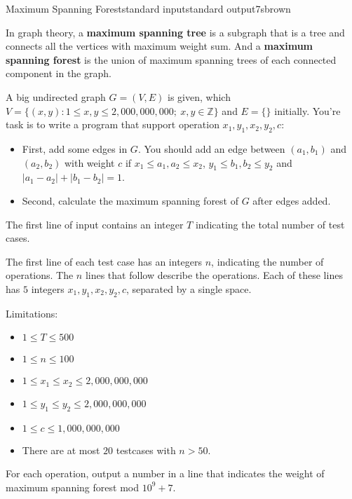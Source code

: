 \begin{problem}{Maximum Spanning Forest}{standard input}{standard output}{7s}{brown}

In graph theory, a {\bf maximum spanning tree} is a subgraph that is a tree and connects all the vertices with maximum weight sum. And a {\bf maximum spanning forest} is the union of maximum spanning trees of each connected component in the graph.

A big undirected graph $G=(V,E)$ is given, which $V=\{(x,y) : 1 \le x,y \le 2,000,000,000;~x,y\in\mathbb{Z}\}$ and $E=\{\}$ initially. You're task is to write a program that support operation $x_1,y_1,x_2,y_2,c$:

\begin{itemize}
\item First, add some edges in $G$. You should add an edge between $(a_1, b_1)$ and $(a_2, b_2)$ with weight $c$ if $x_1 \le a_1,a_2 \le x_2$, $y_1 \le b_1, b_2 \le y_2$ and $|a_1 - a_2| + |b_1 - b_2| = 1$.
\item Second, calculate the maximum spanning forest of $G$ after edges added.
\end{itemize}

\InputFile
The first line of input contains an integer $T$ indicating the total number of test cases.

The first line of each test case has an integers $n$, indicating the number of operations. The $n$ lines that follow describe the operations. Each of these lines has $5$ integers $x_1,y_1,x_2,y_2,c$, separated by a single space.

Limitations:
\begin{itemize}
\item $1 \le T \le 500$
\item $1 \le n \le 100$
\item $1 \le x_1 \le x_2 \le 2,000,000,000$
\item $1 \le y_1 \le y_2 \le 2,000,000,000$
\item $1 \le c \le 1,000,000,000$
\item There are at most $20$ testcases with $n > 50$.
\end{itemize}

\OutputFile
For each operation, output a number in a line that indicates the weight of maximum spanning forest mod $10^9+7$.

\Example

\begin{example}
%
\end{example}
\end{problem}